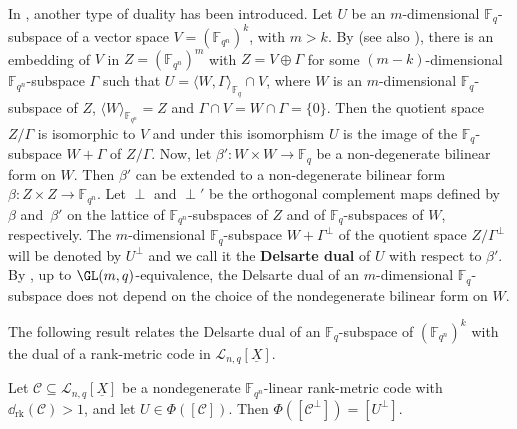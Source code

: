 In \cite[Section 3]{csajbok2021generalising}, another type of duality has been introduced. 	
	Let $U$ be an $m$-dimensional $\mathbb{F}_q$-subspace of a vector space $V=(\mathbb{F}_{q^n})^k$, with $m>k$. By \cite[Theorems 1, 2]{lunardon2004translation} (see also \cite[Theorem 1]{lunardon2002geometric}), there is an embedding of $V$ in $Z=(\mathbb{F}_{q^n})^{m}$ with $Z=V \oplus \Gamma$ for some $(m-k)$-dimensional $\mathbb{F}_{q^n}$-subspace $\Gamma$ such that
	$U=\langle W,\Gamma\rangle_{\mathbb{F}_{q}}\cap V$, where $W$ is an $m$-dimensional $\mathbb{F}_q$-subspace of $Z$, $\langle W\rangle_{\mathbb{F}_{q^n}}=Z$ and $\Gamma\cap V=W\cap \Gamma=\{{0}\}$.
	Then the quotient space $Z/\Gamma$ is isomorphic to $V$ and under this isomorphism $U$ is the image of the $\mathbb{F}_q$-subspace $W+\Gamma$ of $Z /\Gamma$.
	Now, let $\beta'\colon W\times W\rightarrow\mathbb{F}_{q}$ be a non-degenerate bilinear form on $W$. Then $\beta'$ can be extended to a non-degenerate bilinear form $\beta\colon Z\times Z\rightarrow\mathbb{F}_{q^n}$.
	Let $\perp$ and $\perp'$ be the orthogonal complement maps defined by~$\beta$ and~$\beta'$ on the lattice of $\mathbb{F}_{q^n}$-subspaces of $Z$ and of $\mathbb{F}_q$-subspaces of $W$, respectively.
	The $m$-dimensional $\mathbb{F}_q$-subspace $W+\Gamma^{\perp}$ of the quotient space $Z/\Gamma^{\perp}$  will be denoted by $U^\perp$ and we call it the \textbf{Delsarte dual} of $U$ with respect to $\beta'$. By \cite[Remark~3.7]{csajbok2021generalising}, up to $\GL(m,q)$-equivalence,  the Delsarte dual of an $m$-dimensional $\mathbb{F}_q$-subspace does not depend on the choice of the nondegenerate bilinear form on $W$. 	

The following result relates the Delsarte dual of an $\mathbb{F}_q$-subspace of $(\mathbb{F}_{q^n})^k$ with the dual of a rank-metric code in $\mathcal{L}_{n,q}[\underline{X}]$.

\begin{theorem}\label{thm:duality_delsarte_codes}
Let $\mathcal{C}\subseteq \mathcal{L}_{n,q}[\underline{X}]$ be a nondegenerate ${\mathbb F}_{q^n}$-linear rank-metric code with ${\dd_{\mathrm{rk}}}(\mathcal{C})>1$, and let $U\in \Phi([\mathcal{C}])$. 
Then $\Phi([\mathcal{C}^\perp])=[U^\perp]$.
\end{theorem}

